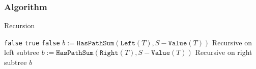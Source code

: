 \subsubsection{Algorithm}
\setcounter{algorithm}{0}
\begin{algorithm}[H]
\caption{Recursion}
\begin{algorithmic}[1]
\State \Return \texttt{false}
\EndIf
{}
\State \Return \texttt{true}
\Else
\State \Return \texttt{false}
\EndIf
\EndIf
\State $b:=\texttt{HasPathSum}(\texttt{Left}(T), S - \texttt{Value}(T))$ \Comment Recursive on left subtree
\State $b:=\texttt{HasPathSum}(\texttt{Right}(T), S - \texttt{Value}(T))$ \Comment Recursive on right subtree
\EndIf
\State \Return $b$
\EndProcedure
\end{algorithmic}
\end{algorithm}